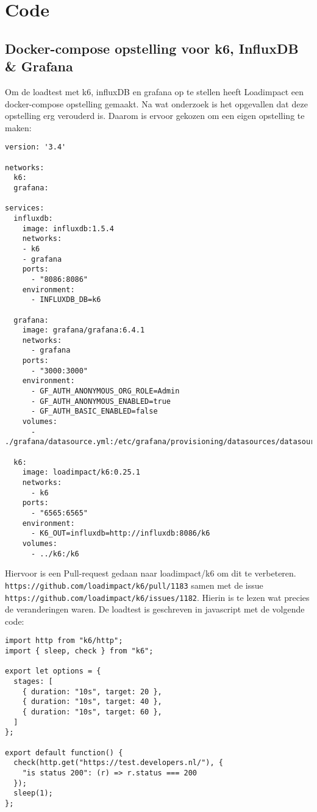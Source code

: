 
\chapter{Code} %

\label{BijlageCode} 

\section{Docker-compose opstelling voor k6, InfluxDB \& Grafana}

\label{Bijlagek6}

Om de loadtest met k6, influxDB en grafana op te stellen heeft Loadimpact een docker-compose opstelling gemaakt. Na wat onderzoek is het opgevallen dat deze opstelling erg verouderd is. Daarom is ervoor gekozen om een eigen opstelling te maken:
\begin{verbatim}
version: '3.4'

networks:
  k6:
  grafana:

services:
  influxdb:
    image: influxdb:1.5.4
    networks:
    - k6
    - grafana
    ports:
      - "8086:8086"
    environment:
      - INFLUXDB_DB=k6
    
  grafana:
    image: grafana/grafana:6.4.1
    networks:
      - grafana
    ports:
      - "3000:3000"
    environment:
      - GF_AUTH_ANONYMOUS_ORG_ROLE=Admin
      - GF_AUTH_ANONYMOUS_ENABLED=true
      - GF_AUTH_BASIC_ENABLED=false
    volumes:
      - ./grafana/datasource.yml:/etc/grafana/provisioning/datasources/datasource.yml
  
  k6:
    image: loadimpact/k6:0.25.1
    networks:
      - k6
    ports:
      - "6565:6565"
    environment:
      - K6_OUT=influxdb=http://influxdb:8086/k6
    volumes:
      - ../k6:/k6
\end{verbatim}

Hiervoor is een Pull-request gedaan naar loadimpact/k6 om dit te verbeteren. \texttt{https://github.com/loadimpact/k6/pull/1183} samen met de issue\\ \texttt{https://github.com/loadimpact/k6/issues/1182}. Hierin is te lezen wat precies de veranderingen waren. De loadtest is geschreven in javascript met de volgende code:
\begin{verbatim}
import http from "k6/http";
import { sleep, check } from "k6";

export let options = {
  stages: [
    { duration: "10s", target: 20 },
    { duration: "10s", target: 40 },
    { duration: "10s", target: 60 },
  ]
};

export default function() {
  check(http.get("https://test.developers.nl/"), {
    "is status 200": (r) => r.status === 200
  });
  sleep(1);
};
\end{verbatim}
